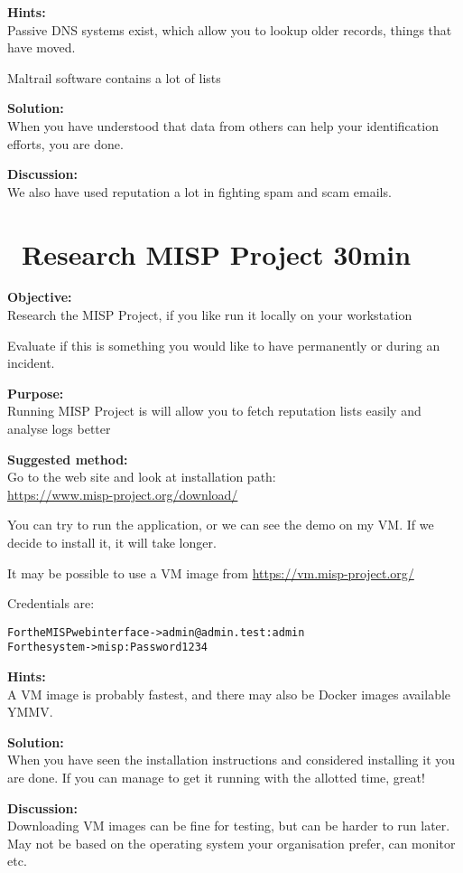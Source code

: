 \documentclass[a4paper,11pt,notitlepage]{report}
\begin{document}
{\bf Hints:}\\
Passive DNS systems exist, which allow you to lookup older records, things that have moved.

Maltrail software contains a lot of lists\\

{\bf Solution:}\\
When you have understood that data from others can help your identification efforts, you are done.

{\bf Discussion:}\\
We also have used reputation a lot in fighting spam and scam emails.



\chapter{\faInfoCircle\ Research MISP Project 30min}
\label{ex:misp-install}


{\bf Objective:}\\
Research the MISP Project, if you like run it locally on your workstation

Evaluate if this is something you would like to have permanently or during an incident.

{\bf Purpose:}\\
Running MISP Project is  will allow you to fetch reputation lists easily and analyse logs better

{\bf Suggested method:}\\
Go to the web site and look at installation path:\\
\url{https://www.misp-project.org/download/}

You can try to run the application, or we can see the demo on my VM. If we decide to install it, it will take longer.

It may be possible to use a VM image from \url{https://vm.misp-project.org/}

Credentials are:
\begin{alltt}\footnotesize
For the MISP web interface -> admin@admin.test:admin
For the system -> misp:Password1234
\end{alltt}


{\bf Hints:}\\
A VM image is probably fastest, and there may also be Docker images available YMMV.

{\bf Solution:}\\
When you have seen the installation instructions and considered installing it you are done. If you can manage to get it running with the allotted time, great!

{\bf Discussion:}\\
Downloading VM images can be fine for testing, but can be harder to run later. May not be based on the operating system your organisation prefer, can monitor etc.
\end{document}
